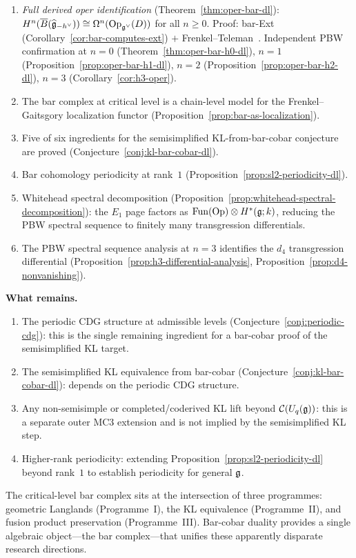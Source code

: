 \begin{enumerate}
\item \emph{Full derived oper identification}
  (Theorem~\ref{thm:oper-bar-dl}):
  $H^n(\overline{B}(\widehat{\mathfrak{g}}_{-h^\vee})) \cong
  \Omega^n(\mathrm{Op}_{\mathfrak{g}^\vee}(D))$ for all $n \geq 0$.
  Proof: bar-Ext (Corollary~\ref{cor:bar-computes-ext}) $+$
  Frenkel--Teleman~\cite{FT06}.
  Independent PBW confirmation at $n = 0$
  (Theorem~\ref{thm:oper-bar-h0-dl}), $n = 1$
  (Proposition~\ref{prop:oper-bar-h1-dl}), $n = 2$
  (Proposition~\ref{prop:oper-bar-h2-dl}), $n = 3$
  (Corollary~\ref{cor:h3-oper}).
\item The bar complex at critical level is a chain-level model for
  the Frenkel--Gaitsgory localization functor
  (Proposition~\ref{prop:bar-as-localization}).
\item Five of six ingredients for the semisimplified
  KL-from-bar-cobar conjecture are proved
  (Conjecture~\ref{conj:kl-bar-cobar-dl}).
\item Bar cohomology periodicity at rank~$1$
  (Proposition~\ref{prop:sl2-periodicity-dl}).
\item Whitehead spectral decomposition
  (Proposition~\ref{prop:whitehead-spectral-decomposition}):
  the $E_1$ page factors as
  $\mathrm{Fun}(\mathrm{Op}) \otimes H^*(\mathfrak{g}; k)$,
  reducing the PBW spectral sequence to finitely many
  transgression differentials.
\item The PBW spectral sequence analysis at $n = 3$ identifies the
  $d_4$ transgression differential
  (Proposition~\ref{prop:h3-differential-analysis},
  Proposition~\ref{prop:d4-nonvanishing}).
\end{enumerate}

\noindent
\textbf{What remains.}
\begin{enumerate}
\item The periodic CDG structure at admissible levels
  (Conjecture~\ref{conj:periodic-cdg}): this is the single
  remaining ingredient for a bar-cobar proof of the semisimplified
  KL target.
\item The semisimplified KL equivalence from bar-cobar
  (Conjecture~\ref{conj:kl-bar-cobar-dl}): depends on the periodic
  CDG structure.
\item Any non-semisimple or completed/coderived KL lift beyond
  $\mathcal{C}(U_q(\mathfrak{g}))$: this is a separate outer MC3 extension and
  is not implied by the semisimplified KL step.
\item Higher-rank periodicity: extending
  Proposition~\ref{prop:sl2-periodicity-dl} beyond rank~$1$
  to establish periodicity for general $\mathfrak{g}$.
\end{enumerate}

The critical-level bar complex sits at the intersection of three
programmes: geometric Langlands (Programme~I), the KL equivalence
(Programme~II), and fusion product preservation (Programme~III).
Bar-cobar duality provides a single algebraic object---the bar
complex---that unifies these apparently disparate research
directions.
